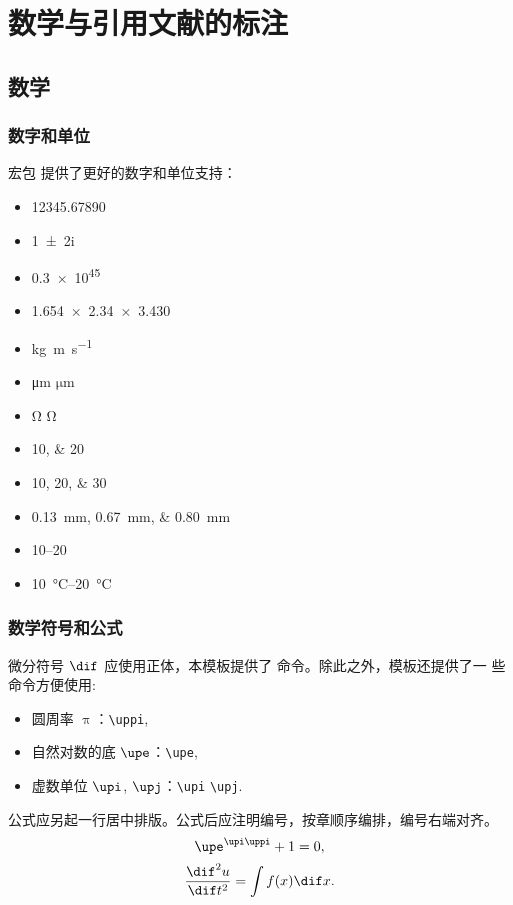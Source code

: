 
\chapter{数学与引用文献的标注}

\section{数学}

\subsection{数字和单位}

宏包  提供了更好的数字和单位支持：
\begin{itemize}
  \item \num{12345.67890}
  \item \num{1+-2i}
  \item \num{.3e45}
  \item \num{1.654 x 2.34 x 3.430}
  \item \si{kg.m.s^{-1}}
  \item \si{\micro\meter} $\si{\micro\meter}$
  \item \si{\ohm} $\si{\ohm}$
  \item \numlist{10;20}
  \item \numlist{10;20;30}
  \item \SIlist{0.13;0.67;0.80}{\milli\metre}
  \item \numrange{10}{20}
  \item \SIrange{10}{20}{\degreeCelsius}
\end{itemize}

\subsection{数学符号和公式}

微分符号 $\dif$ 应使用正体，本模板提供了  命令。除此之外，模板还提供了一
些命令方便使用:
\begin{itemize}
  \item 圆周率 $\uppi$：\verb|\uppi|,
  \item 自然对数的底 $\upe$：\verb|\upe|,
  \item 虚数单位 $\upi$, $\upj$：\verb|\upi| \verb|\upj|.
\end{itemize}

公式应另起一行居中排版。公式后应注明编号，按章顺序编排，编号右端对齐。
\begin{equation}
  \upe^{\upi\uppi} + 1 = 0,
\end{equation}
\begin{equation}
  \frac{\dif^2 u}{\dif t^2} = \int f(x) \dif x.
\end{equation}

